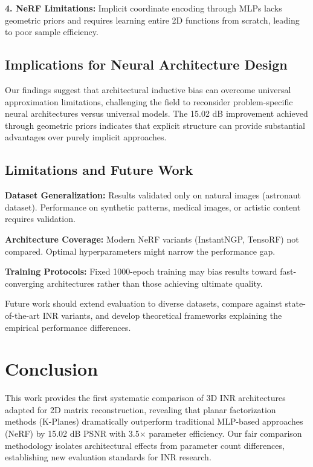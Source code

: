 \documentclass{article}
\begin{document}
\textbf{4. NeRF Limitations:} Implicit coordinate encoding through MLPs lacks geometric priors and requires learning entire 2D functions from scratch, leading to poor sample efficiency.

\subsection{Implications for Neural Architecture Design}

Our findings suggest that architectural inductive bias can overcome universal approximation limitations, challenging the field to reconsider problem-specific neural architectures versus universal models. The 15.02 dB improvement achieved through geometric priors indicates that explicit structure can provide substantial advantages over purely implicit approaches.

\subsection{Limitations and Future Work}

\textbf{Dataset Generalization:} Results validated only on natural images (astronaut dataset). Performance on synthetic patterns, medical images, or artistic content requires validation.

\textbf{Architecture Coverage:} Modern NeRF variants (InstantNGP, TensoRF) not compared. Optimal hyperparameters might narrow the performance gap.

\textbf{Training Protocols:} Fixed 1000-epoch training may bias results toward fast-converging architectures rather than those achieving ultimate quality.

Future work should extend evaluation to diverse datasets, compare against state-of-the-art INR variants, and develop theoretical frameworks explaining the empirical performance differences.

\section{Conclusion}

This work provides the first systematic comparison of 3D INR architectures adapted for 2D matrix reconstruction, revealing that planar factorization methods (K-Planes) dramatically outperform traditional MLP-based approaches (NeRF) by 15.02 dB PSNR with 3.5× parameter efficiency. Our fair comparison methodology isolates architectural effects from parameter count differences, establishing new evaluation standards for INR research.
\end{document}
